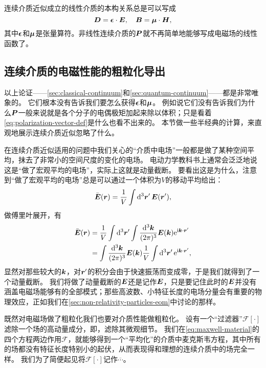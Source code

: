 连续介质近似成立的线性介质的本构关系总是可以写成
\begin{equation}
    \vb*{D} = \vb*{\epsilon} \cdot \vb*{E}, \quad \vb*{B} = \vb*{\mu} \cdot \vb*{H},
\end{equation}
其中$\vb*{\epsilon}$和$\vb*{\mu}$是张量算符。非线性连续介质的$\vb*{P}$就不再简单地能够写成电磁场的线性函数了。

\subsection{连续介质的电磁性能的粗粒化导出}\label{sec:continuous-epsilon-mu-calc}

以上论证——\autoref{sec:classical-continuum}和\autoref{sec:quantum-continuum}——都是非常唯象的。
它们根本没有告诉我们要怎么获得$\vb*{\epsilon}$和$\vb*{\mu}$。
例如说它们没有告诉我们为什么$\vb*{P}$一般来说就是各个分子的电偶极矩加起来除以体积；只是看着\eqref{eq:polarization-vector-def}是什么也看不出来的。
本节做一些半经典的计算，来直观地展示连续介质近似忽略了什么。

在连续介质近似适用的问题中我们关心的“介质中电场”一般都是做了某种空间平均，抹去了非常小的空间尺度的变化的电场。
电动力学教科书上通常会泛泛地说这是“做了宏观平均的电场”，实际上这就是动量截断。
要看出这是为什么，注意到“做了宏观平均的电场”总是可以通过一个体积为$V$的移动平均给出：
\[
    \bar{\vb*{E}}(\vb*{r}) = \frac{1}{V} \int \dd[3]{\vb*{r}'} \vb*{E}(\vb*{r}'),
\]
做傅里叶展开，有
\[
    \begin{aligned}
        \bar{\vb*{E}}(\vb*{r}) &= \frac{1}{V} \int \dd[3]{\vb*{r}'} \int \frac{\dd[3]{\vb*{k}}}{(2\pi)^3} \vb*{E}(\vb*{k}) \mathrm{e}^{\mathrm{i} \vb*{k} \cdot \vb*{r}'} \\
        &= \int \frac{\dd[3]{\vb*{k}}}{(2\pi)^3} \vb*{E}(\vb*{k}) \frac{1}{V} \int \dd[3]{\vb*{r}'} \mathrm{e}^{\mathrm{i} \vb*{k} \cdot \vb*{r}'},
    \end{aligned}
\]
显然对那些较大的$\vb*{k}$，对$\vb*{r}'$的积分会由于快速振荡而变成零，于是我们就得到了一个动量截断。
我们将做了动量截断的$\vb*{E}$还是记作$\vb*{E}$，只是要记住此时的$\vb*{E}$并没有涵盖电磁场能够有的全部模式；那些高波数、小特征长度的电场分量会有重要的物理效应，正如我们在\autoref{sec:non-relativity-particles-eom}中讨论的那样。

既然对电磁场做了粗粒化我们也要对介质性能做粗粒化。
设有一个“过滤器”$\mathcal{F}[\cdot]$滤除一个场的高动量成分，即，滤除其微观细节。
我们在\eqref{eq:maxwell-material}的四个方程两边作用$\mathcal{F}$，就能够得到一个“平均化”的介质中麦克斯韦方程，其中所有的场都没有特征长度特别小的起伏，从而表现得和理想的连续介质中的场完全一样。
我们为了简便起见将$\mathcal{F}[\cdot]$记作$\overline{\cdots}$。

